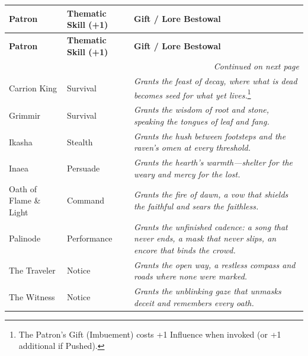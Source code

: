 \renewcommand{\arraystretch}{1.25}
\setlength{\LTpre}{0.5em}
\setlength{\LTpost}{0.5em}

\begin{longtable}{@{}p{4.2cm}p{3.2cm}p{7.2cm}@{}}
\toprule
\textbf{Patron} & \textbf{Thematic Skill (+1)} & \textbf{Gift / Lore Bestowal} \\
\midrule
\endfirsthead

\toprule
\textbf{Patron} & \textbf{Thematic Skill (+1)} & \textbf{Gift / Lore Bestowal} \\
\midrule
\endhead

\midrule
\multicolumn{3}{r}{\emph{Continued on next page}} \\
\bottomrule
\endfoot

\bottomrule
\endlastfoot

Carrion King & Survival &
\emph{Grants the feast of decay, where what is dead becomes seed for what yet lives.}\footnote{The Patron's Gift (Imbuement) costs +1 Influence when invoked (or +1 additional if Pushed).} \\

Grimmir & Survival &
\emph{Grants the wisdom of root and stone, speaking the tongues of leaf and fang.}\footnotemark[\value{footnote}] \\

Ikasha & Stealth &
\emph{Grants the hush between footsteps and the raven's omen at every threshold.}\footnotemark[\value{footnote}] \\

Inaea & Persuade &
\emph{Grants the hearth's warmth---shelter for the weary and mercy for the lost.}\footnotemark[\value{footnote}] \\

Oath of Flame \& Light & Command &
\emph{Grants the fire of dawn, a vow that shields the faithful and sears the faithless.}\footnotemark[\value{footnote}] \\

Palinode & Performance &
\emph{Grants the unfinished cadence: a song that never ends, a mask that never slips, an encore that binds the crowd.}\footnotemark[\value{footnote}] \\

The Traveler & Notice &
\emph{Grants the open way, a restless compass and roads where none were marked.}\footnotemark[\value{footnote}] \\

The Witness & Notice &
\emph{Grants the unblinking gaze that unmasks deceit and remembers every oath.}\footnotemark[\value{footnote}] \\

\end{longtable}

